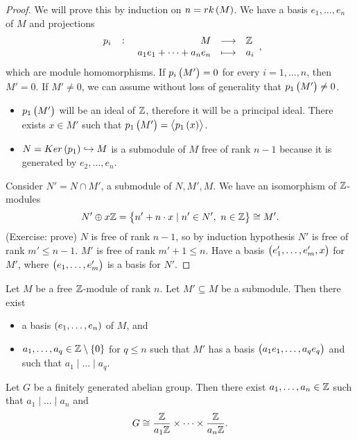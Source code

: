 \begin{proof}
We will prove this by induction on $ n = rk\br{M} $. We have a basis $ e_1, \dots, e_n $ of $ M $ and projections
$$ \function[p_i]{M}{\Z}{a_1e_1 + \dots + a_ne_n}{a_i}, $$
which are module homomorphisms. If $ p_i\br{M'} = 0 $ for every $ i = 1, \dots, n $, then $ M' = 0 $. If $ M' \ne 0 $, we can assume without loss of generality that $ p_1\br{M'} \ne 0 $.
\begin{itemize}
\item $ p_1\br{M'} $ will be an ideal of $ \mathbb{Z} $, therefore it will be a principal ideal. There exists $ x \in M' $ such that $ p_1\br{M'} = \abr{p_1\br{x}} $.
\item $ N = Ker\br{p_1} \hookrightarrow M $ is a submodule of $ M $ free of rank $ n - 1 $ because it is generated by $ e_2, \dots, e_n $.
\end{itemize}
Consider $ N' = N \cap M' $, a submodule of $ N, M', M $. We have an isomorphism of $ \mathbb{Z} $-modules
$$ N' \oplus x\Z = \cbr{n' + n \cdot x \mid n' \in N', \ n \in \Z} \cong M'. $$
(Exercise: prove) $ N $ is free of rank $ n - 1 $, so by induction hypothesis $ N' $ is free of rank $ m' \le n - 1 $. $ M' $ is free of rank $ m' + 1 \le n $. Have a basis $ \br{e_1', \dots, e_m', x} $ for $ M' $, where $ \br{e_1, \dots, e_m'} $ is a basis for $ N' $.
\end{proof}

\begin{theorem}
\label{thm:structure}
Let $ M $ be a free $ \mathbb{Z} $-module of rank $ n $. Let $ M' \subseteq M $ be a submodule. Then there exist
\begin{itemize}
\item a basis $ \br{e_1, \dots, e_n} $ of $ M $, and
\item $ a_1, \dots, a_q \in \Z \setminus \cbr{0} $ for $ q \le n $ such that $ M' $ has a basis $ \br{a_1e_1, \dots, a_qe_q} $ and such that $ a_1 \mid \dots \mid a_q $.
\end{itemize}
\end{theorem}

\begin{corollary}
\label{cor:structure}
Let $ G $ be a finitely generated abelian group. Then there exist $ a_1, \dots, a_n \in \mathbb{Z} $ such that $ a_1 \mid \dots \mid a_n $ and
$$ G \cong \dfrac{\mathbb{Z}}{a_1\mathbb{Z}} \times \dots \times \dfrac{\mathbb{Z}}{a_n\mathbb{Z}}. $$
\end{corollary}


